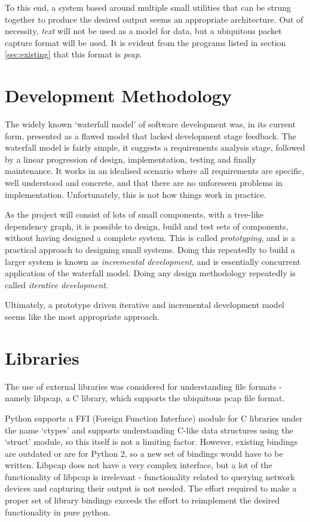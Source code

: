 \documentclass[10pt,a4paper,notitlepage]{report}
\begin{document}
To this end, a system based around multiple small utilities that can be strung together to produce the desired output seems an appropriate architecture. Out of necessity, \emph{text} will not be used as a model for data, but a ubiquitous packet capture format will be used. It is evident from the programs listed in section \ref{sec:existing} that this format is \emph{pcap}.

\section{Development Methodology}
The widely known `waterfall model' of software development was, in its current form, presented as a flawed model that lacked development stage feedback\cite{wwr-waterfall-notes}. The waterfall model is fairly simple, it suggests a requirements analysis stage, followed by a linear progression of design, implementation, testing and finally maintenance. It works in an idealised scenario where all requirements are specific, well understood and concrete, and that there are no unforeseen problems in implementation. Unfortunately, this is not how things work in practice.

As the project will consist of lots of small components, with a tree-like dependency graph, it is possible to design, build and test sets of components, without having designed a complete system. This is called \emph{prototyping}, and is a practical approach to designing small systems.
Doing this repeatedly to build a larger system is known as \emph{incremental development}, and is essentially concurrent application of the waterfall model. Doing any design methodology repeatedly is called \emph{iterative development}.

Ultimately, a prototype driven iterative and incremental development model seems like the most appropriate approach.

\section{Libraries}
The use of external libraries was considered for understanding file formats - namely libpcap, a C library, which supports the ubiquitous pcap file format.

Python supports a FFI (Foreign Function Interface) module for C libraries under the name `ctypes' and supports understanding C-like data structures using the `struct' module, so this itself is not a limiting factor.
However, existing bindings are outdated or are for Python 2, so a new set of bindings would have to be written. Libpcap does not have a very complex interface, but a lot of the functionality of libpcap is irrelevant - functionality related to querying network devices and capturing their output is not needed. The effort required to make a proper set of library bindings exceeds the effort to reimplement the desired functionality in pure python.
\end{document}
